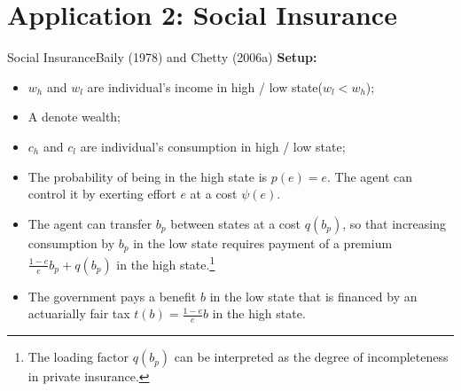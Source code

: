 \documentclass{beamer}
\begin{document}
\section{Application 2: Social Insurance}
\begin{frame}[shrink]
	\transfade %
	\tableofcontents[sectionstyle=show/shaded,subsectionstyle=show/shaded/hide]
	\addtocounter{framenumber}{-1}
\end{frame}
\begin{frame}{Social Insurance}{Baily (1978) and Chetty (2006a)}
	\textbf{Setup:}
	\begin{itemize}
		\item $w_h$ and $w_l$ are individual's income in high / low state($w_l<w_h$);
		\item A denote wealth;
		\item $c_h$ and $c_l$ are individual's consumption in high / low state;
		\item The probability of being in the high state is $p(e)=e$. The agent can control it by exerting effort $e$ at a cost $\psi(e)$.
		\item The agent can transfer $b_p$ between states at a cost $q(b_p)$, so that increasing consumption by $b_p$ in the low state requires payment of a premium $\frac{1-e}{e}b_p+q(b_p)$ in the high state.\footnote{The loading factor $q(b_p)$ can be interpreted as the degree of incompleteness in private insurance.}
		\item The government pays a benefit $b$ in the low state that is financed by an actuarially fair tax $t(b)=\frac{1-e}{e}b$ in the high state.
	\end{itemize}
\end{frame}
\end{document}

